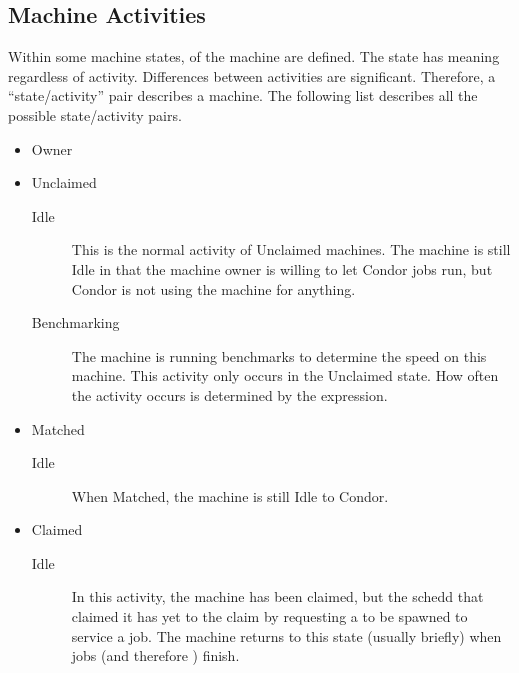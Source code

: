 \subsection{\label{sec:Activities}
Machine Activities}

Within some machine states,
 of the machine are defined.
The state has meaning regardless of activity.
Differences between activities are significant.
Therefore, a ``state/activity'' pair describes
a machine.
The following list describes all the possible state/activity pairs.

\begin{itemize}

\item Owner

\item Unclaimed
\begin{description}
  \item[Idle] This is the normal activity of Unclaimed machines.
    The machine is still Idle in that the machine owner is willing to
    let Condor jobs run, but Condor is not using the
    machine for anything.
  
  \item[Benchmarking] The machine is running benchmarks to
    determine the speed on this machine.
    This activity only occurs in the Unclaimed state.
    How often the activity occurs is
    determined by the  expression.
\end{description}

\item Matched
\begin{description}
  \item[Idle] When Matched, the machine is still Idle to Condor.
\end{description}

\item Claimed
\begin{description}
\item[Idle] In this activity, the machine has been claimed, but the
  schedd that claimed it has yet to  the claim by
  requesting a  to be spawned to service a job.
  The machine returns to this state (usually briefly) when jobs
  (and therefore ) finish.
  

\end{description}
\end{itemize}
